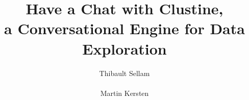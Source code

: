 \documentclass{sig-alternate}
\begin{document}
\title{Have a Chat with Clustine,\\a Conversational Engine for Data Exploration}

\author{
\alignauthor
Thibault Sellam\\
       \\
\alignauthor
Martin Kersten\\
       \\
}

\maketitle
\begin{abstract} 
\end{abstract}





\end{document}
